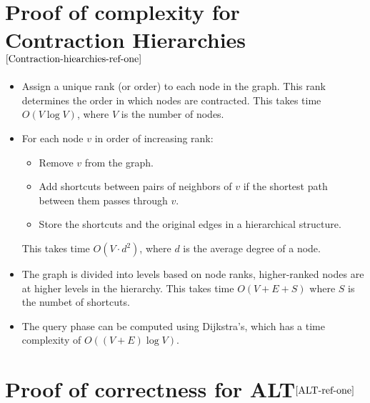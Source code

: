 \begin{appendices}
\section{Proof of complexity for Contraction Hierarchies$^{\cite{Contraction-hiearchies-ref-one}}$}\label{appendix:constraction:complexity}
	\begin{itemize}
		\item Assign a unique rank (or order) to each node in the graph. This rank determines the order in which nodes are contracted. This takes time $O(V \log V)$, where $V$ is the number of nodes.
		\item For each node $v$ in order of increasing rank:
			\begin{itemize}
				\item Remove $v$ from the graph.
				\item Add shortcuts between pairs of neighbors of $v$ if the shortest path between them passes through $v$.
				\item Store the shortcuts and the original edges in a hierarchical structure.
			\end{itemize}
			This takes time $O(V \cdot d^{2})$, where $d$ is the average degree of a node.
		\item The graph is divided into levels based on node ranks, higher-ranked nodes are at higher levels in the hierarchy. This takes time $O(V + E + S)$ where $S$ is the numbet of shortcuts.
		\item The query phase can be computed using Dijkstra's, which has a time complexity of $O((V + E) \log V)$.
	\end{itemize}

\section{Proof of correctness for ALT$^{\cite{ALT-ref-one}}$}\label{appendix:ALT:correctness}


\end{appendices}
